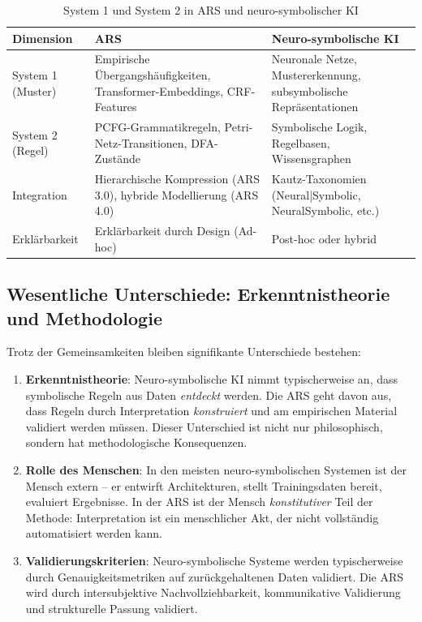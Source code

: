 \documentclass[12pt,a4paper]{article}
\begin{document}
\begin{table}[H]
\centering
\caption{System 1 und System 2 in ARS und neuro-symbolischer KI}
\label{tab:kahneman}
\begin{tabular}{@{} p{3cm} p{4cm} p{4cm} @{}}
\toprule
\textbf{Dimension} & \textbf{ARS} & \textbf{Neuro-symbolische KI} \\
\midrule
System 1 (Muster) & Empirische Übergangshäufigkeiten, Transformer-Embeddings, CRF-Features & Neuronale Netze, Mustererkennung, subsymbolische Repräsentationen \\
System 2 (Regel) & PCFG-Grammatikregeln, Petri-Netz-Transitionen, DFA-Zustände & Symbolische Logik, Regelbasen, Wissensgraphen \\
Integration & Hierarchische Kompression (ARS 3.0), hybride Modellierung (ARS 4.0) & Kautz-Taxonomien (Neural|Symbolic, NeuralSymbolic, etc.) \\
Erklärbarkeit & Erklärbarkeit durch Design (Ad-hoc) & Post-hoc oder hybrid \\
\bottomrule
\end{tabular}
\end{table}

\subsection{Wesentliche Unterschiede: Erkenntnistheorie und Methodologie}

Trotz der Gemeinsamkeiten bleiben signifikante Unterschiede bestehen:

\begin{enumerate}
    \item \textbf{Erkenntnistheorie}: Neuro-symbolische KI nimmt typischerweise an, 
    dass symbolische Regeln aus Daten \textit{entdeckt} werden. Die ARS geht davon 
    aus, dass Regeln durch Interpretation \textit{konstruiert} und am empirischen 
    Material validiert werden müssen. Dieser Unterschied ist nicht nur philosophisch, 
    sondern hat methodologische Konsequenzen.
    
    \item \textbf{Rolle des Menschen}: In den meisten neuro-symbolischen Systemen 
    ist der Mensch extern – er entwirft Architekturen, stellt Trainingsdaten bereit, 
    evaluiert Ergebnisse. In der ARS ist der Mensch \textit{konstitutiver} Teil der 
    Methode: Interpretation ist ein menschlicher Akt, der nicht vollständig 
    automatisiert werden kann.
    
    \item \textbf{Validierungskriterien}: Neuro-symbolische Systeme werden typischerweise 
    durch Genauigkeitsmetriken auf zurückgehaltenen Daten validiert. Die ARS wird 
    durch intersubjektive Nachvollziehbarkeit, kommunikative Validierung und 
    strukturelle Passung validiert.
\end{enumerate}
\end{document}
